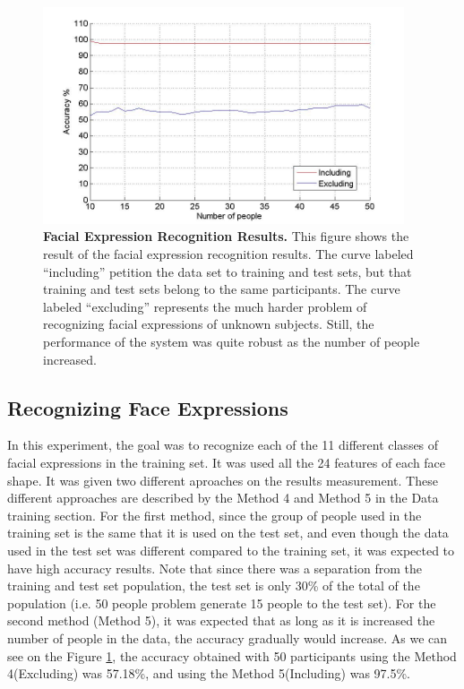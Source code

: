 \documentclass[]{article}
\begin{document}
\begin{figure}[ht]
\begin{center}
\vspace{-3mm}
\includegraphics[width=0.95\textwidth]{figures/figureRecognizeFacialExpressionTrue.jpg}
\end{center}
\caption{\textbf{Facial Expression Recognition Results.} This figure shows the result of the facial expression recognition results.
The curve labeled ``including'' petition the data set to training and test sets, but that training and test sets belong to the same participants.
The curve labeled ``excluding'' represents the much harder problem of recognizing facial expressions of unknown subjects. Still, 
the performance of the system was quite robust as the number of people increased.}
\label{identityRecognition}
\end{figure}

\subsection{Recognizing Face Expressions}

In this experiment, the goal was to recognize each of the 11 different classes
of facial expressions in the training set. It was used all the 24 features of
each face shape. It was given two different aproaches on the results
measurement. These different approaches are described by the Method 4 and
Method 5 in the Data training section.
For the first method, since the group of people used in the training set is the
same that it is used on the test set, and even though the data used in the test
set was different compared to the training set, it was expected to have high
accuracy results. Note that since there was a separation from the training and
test set population, the test set is only 30\% of the total of the population
(i.e. 50 people problem generate 15 people to the test set).
For the second method (Method 5), it was expected that as long as it is
increased the number of people in the data, the accuracy gradually would increase.
As we can see on the Figure \ref{identityRecognition}, the accuracy obtained
with 50 participants using the Method 4(Excluding) was 57.18\%, and using the
Method 5(Including) was 97.5\%.
 
\end{document}

